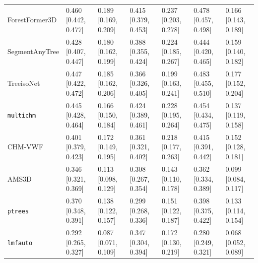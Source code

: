 \documentclass[10pt]{article}
\begin{document}
{\begin{xltabular}{\textwidth}{LLLLLLL}
ForestFormer3D & 0.460 [0.442, 0.477] & 0.189 [0.169, 0.209] & 0.415 [0.379, 0.453] & 0.237 [0.203, 0.278] & 0.478 [0.457, 0.498] & 0.166 [0.143, 0.189] \\
SegmentAnyTree & 0.428 [0.407, 0.447] & 0.180 [0.162, 0.199] & 0.388 [0.355, 0.424] & 0.224 [0.185, 0.267] & 0.444 [0.420, 0.465] & 0.159 [0.140, 0.182] \\
TreeisoNet & 0.447 [0.422, 0.472] & 0.185 [0.162, 0.206] & 0.366 [0.326, 0.405] & 0.199 [0.163, 0.241] & 0.483 [0.455, 0.510] & 0.177 [0.152, 0.204] \\
\texttt{multichm} & 0.445 [0.428, 0.464] & 0.166 [0.150, 0.184] & 0.424 [0.389, 0.461] & 0.228 [0.195, 0.264] & 0.454 [0.434, 0.475] & 0.137 [0.119, 0.158] \\
CHM-VWF & 0.401 [0.379, 0.423] & 0.172 [0.149, 0.195] & 0.361 [0.321, 0.402] & 0.218 [0.177, 0.263] & 0.415 [0.391, 0.442] & 0.152 [0.128, 0.181] \\
AMS3D & 0.346 [0.321, 0.369] & 0.113 [0.098, 0.129] & 0.308 [0.267, 0.354] & 0.143 [0.110, 0.178] & 0.362 [0.334, 0.389] & 0.099 [0.084, 0.117] \\
\texttt{ptrees} & 0.370 [0.348, 0.391] & 0.138 [0.122, 0.157] & 0.299 [0.268, 0.336] & 0.151 [0.122, 0.187] & 0.398 [0.375, 0.422] & 0.133 [0.114, 0.154] \\
\texttt{lmfauto} & 0.292 [0.265, 0.327] & 0.087 [0.071, 0.109] & 0.347 [0.304, 0.394] & 0.172 [0.130, 0.219] & 0.280 [0.249, 0.321] & 0.068 [0.052, 0.089] \\
\end{xltabular}
}
\end{document}
